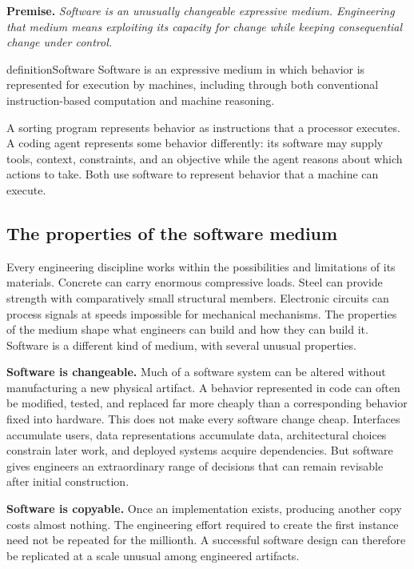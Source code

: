 \textbf{Premise.} \emph{Software is an unusually changeable expressive medium. Engineering that medium means
exploiting its capacity for change while keeping consequential change under control.}

\begin{bookbox}{definition}{Software} %
Software is an expressive medium in which behavior is represented for execution by machines, including
through both conventional instruction-based computation and machine reasoning.

A sorting program represents behavior as instructions that a processor executes. A coding agent
represents some behavior differently: its software may supply tools, context, constraints, and an
objective while the agent reasons about which actions to take. Both use software to represent behavior
that a machine can execute.
\end{bookbox}

\subsection{The properties of the software medium}\label{sec-software-medium}

Every engineering discipline works within the possibilities and limitations of its materials. Concrete
can carry enormous compressive loads. Steel can provide strength with comparatively small structural
members. Electronic circuits can process signals at speeds impossible for mechanical mechanisms. The
properties of the medium shape what engineers can build and how they can build it. Software is a
different kind of medium, with several unusual properties.

\textbf{Software is changeable.} Much of a software system can be altered without manufacturing a new
physical artifact. A behavior represented in code can often be modified, tested, and replaced far more
cheaply than a corresponding behavior fixed into hardware. This does not make every software change
cheap. Interfaces accumulate users, data representations accumulate data, architectural choices
constrain later work, and deployed systems acquire dependencies. But software gives engineers an
extraordinary range of decisions that can remain revisable after initial construction.

\textbf{Software is copyable.} Once an implementation exists, producing another copy costs almost nothing.
The engineering effort required to create the first instance need not be repeated for the millionth. A
successful software design can therefore be replicated at a scale unusual among engineered artifacts.

